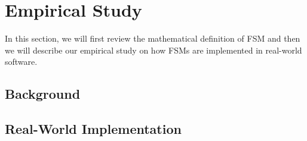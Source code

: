 \section{Empirical Study}
In this section, we will first review the mathematical definition of FSM and then 
we will describe our empirical study on how FSMs are implemented 
in real-world software. 

\subsection{Background}

\subsection{Real-World Implementation}